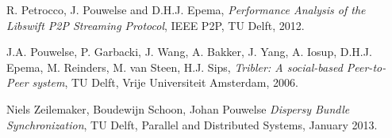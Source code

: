 \documentclass[pdftex, 10pt, a4paper]{report}
\begin{document}
\pagestyle{fancy}
\fancyhead{}
\fancyhead[LE, LO] {\today}



\tableofcontents

\pagebreak



\begin{thebibliography}{9}

   R. Petrocco, J. Pouwelse and D.H.J. Epema,
  \emph{Performance Analysis of the Libswift P2P Streaming Protocol},
  IEEE P2P, TU Delft,
  2012.

   J.A. Pouwelse, P. Garbacki, J. Wang, A. Bakker, J. Yang, A. Iosup, D.H.J. Epema, M. Reinders, M. van Steen, H.J. Sips,
  \emph{Tribler: A social-based Peer-to-Peer system},
  TU Delft, Vrije Universiteit Amsterdam,
  2006.

   Niels Zeilemaker, Boudewijn Schoon, Johan Pouwelse
  \emph{Dispersy Bundle Synchronization},
  TU Delft, Parallel and Distributed Systems,
  January 2013.


\end{thebibliography}
\end{document}
